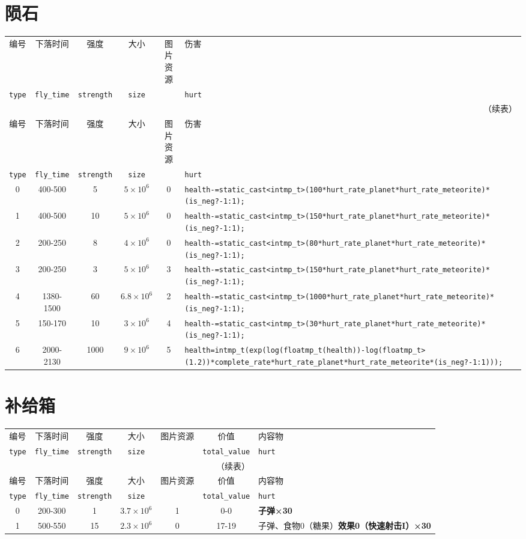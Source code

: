 \documentclass[UTF8,fontset=none,linespread=1.2]{ctexart}
\begin{document}
\section{陨石}
\begin{longtable}{|c|c|c|c|c|>{\centering\arraybackslash}m{10cm}|}
\hline
编号&下落时间&强度&大小&图片资源&伤害\\
\lstinline|type|&\lstinline|fly_time|&\lstinline|strength|&\lstinline|size|&&\lstinline|hurt|\\\hline
\endfirsthead
\multicolumn{6}{r}{（续表）}\\
\hline
编号&下落时间&强度&大小&图片资源&伤害\\
\lstinline|type|&\lstinline|fly_time|&\lstinline|strength|&\lstinline|size|&&\lstinline|hurt|\\\hline
\endhead
0&400-500&5&$5\times10^6$&0&\lstinline|health-=static_cast<intmp_t>(100*hurt_rate_planet*hurt_rate_meteorite)*(is_neg?-1:1);|\\\hline
1&400-500&10&$5\times10^6$&0&\lstinline|health-=static_cast<intmp_t>(150*hurt_rate_planet*hurt_rate_meteorite)*(is_neg?-1:1);|\\\hline
2&200-250&8&$4\times10^6$&0&\lstinline|health-=static_cast<intmp_t>(80*hurt_rate_planet*hurt_rate_meteorite)*(is_neg?-1:1);|\\\hline
3&200-250&3&$5\times10^6$&3&\lstinline|health-=static_cast<intmp_t>(150*hurt_rate_planet*hurt_rate_meteorite)*(is_neg?-1:1);|\\\hline
4&1380-1500&60&$6.8\times10^6$&2&\lstinline|health-=static_cast<intmp_t>(1000*hurt_rate_planet*hurt_rate_meteorite)*(is_neg?-1:1);|\\\hline
5&150-170&10&$3\times10^6$&4&\lstinline|health-=static_cast<intmp_t>(30*hurt_rate_planet*hurt_rate_meteorite)*(is_neg?-1:1);|\\\hline
6&2000-2130&1000&$9\times10^6$&5&\lstinline|health=intmp_t(exp(log(floatmp_t(health))-log(floatmp_t>(1.2))*complete_rate*hurt_rate_planet*hurt_rate_meteorite*(is_neg?-1:1)));|\\\hline
\end{longtable}
\section{补给箱}
\begin{longtable}{|c|c|c|c|c|c|>{\centering\arraybackslash}m{10cm}|}
\hline
编号&下落时间&强度&大小&图片资源&价值&内容物\\
\lstinline|type|&\lstinline|fly_time|&\lstinline|strength|&\lstinline|size|&&\lstinline|total_value|&\lstinline|hurt|\\\hline
\endfirsthead
\multicolumn{6}{r}{（续表）}\\
\hline
编号&下落时间&强度&大小&图片资源&价值&内容物\\
\lstinline|type|&\lstinline|fly_time|&\lstinline|strength|&\lstinline|size|&&\lstinline|total_value|&\lstinline|hurt|\\\hline
\endhead
0&200-300&1&$3.7\times10^6$&1&0-0&\textbf{子弹×30}\\\hline
1&500-550&15&$2.3\times10^6$&0&17-19&子弹、食物0（糖果）\textbf{效果0（快速射击I）×30}\\\hline
\end{longtable}
\end{document}
